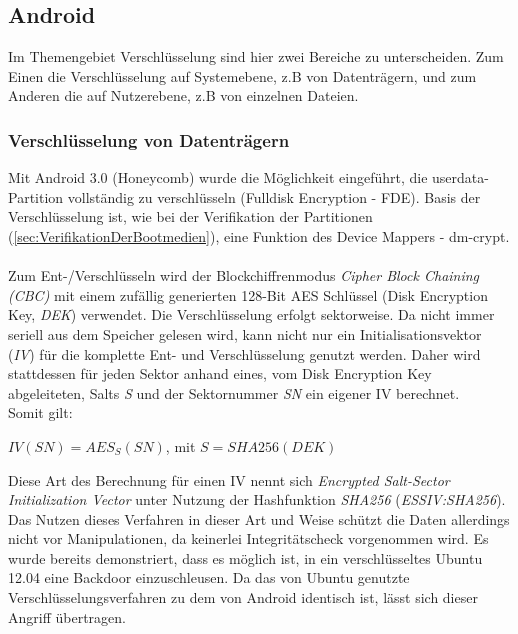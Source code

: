 \subsection{Android}
	Im Themengebiet Verschlüsselung sind hier zwei Bereiche zu unterscheiden. Zum Einen die Verschlüsselung auf Systemebene, z.B von Datenträgern, und zum Anderen die auf Nutzerebene, z.B von einzelnen Dateien.

	\subsubsection{Verschlüsselung von Datenträgern}\label{sec:encrypt-volume}
	Mit Android 3.0 (Honeycomb) wurde die Möglichkeit eingeführt, die userdata-Partition vollständig zu verschlüsseln (Fulldisk Encryption - FDE). Basis der Verschlüsselung ist, wie bei der Verifikation der Partitionen (\ref{sec:VerifikationDerBootmedien}), eine Funktion des Device Mappers - dm-crypt.\\\\
	Zum Ent-/Verschlüsseln wird der Blockchiffrenmodus \textit{Cipher Block Chaining (CBC)} mit einem zufällig generierten 128-Bit AES Schlüssel (Disk Encryption Key, \textit{DEK}) verwendet. Die Verschlüsselung erfolgt sektorweise. Da nicht immer seriell aus dem Speicher gelesen wird, kann nicht nur ein Initialisationsvektor (\textit{IV}) für die komplette Ent- und Verschlüsselung genutzt werden. Daher wird stattdessen für jeden Sektor anhand eines, vom Disk Encryption Key abgeleiteten, Salts \textit{S} und der Sektornummer \textit{SN} ein eigener IV berechnet.\\
	Somit gilt:
\begin{center}
	\begin{math}
	IV(SN) = AES_{S}(SN)\end{math}, mit \begin{math}S = SHA256(DEK)
	\end{math}
\end{center}
	Diese Art des Berechnung für einen IV nennt sich \textit{Encrypted Salt-Sector Initialization Vector} unter Nutzung der Hashfunktion \textit{SHA256} (\textit{ESSIV:SHA256}).\cite[S. 259]{Elenkov2014} Das Nutzen dieses Verfahren in dieser Art und Weise schützt die Daten allerdings nicht vor Manipulationen, da keinerlei Integritätscheck vorgenommen wird. Es wurde bereits demonstriert, dass es möglich ist, in ein verschlüsseltes Ubuntu 12.04 eine Backdoor einzuschleusen. Da das von Ubuntu genutzte Verschlüsselungsverfahren zu dem von Android identisch ist, lässt sich dieser Angriff übertragen\cite{Jakob}.\\\\
